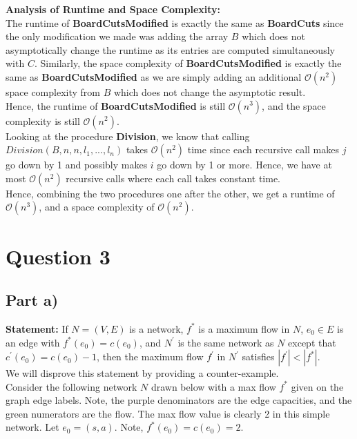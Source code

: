 \documentclass[12pt]{article}
\begin{document}
\textbf{Analysis of Runtime and Space Complexity:} \\

The runtime of \textbf{BoardCutsModified} is exactly the same as \textbf{BoardCuts} since the only modification we made was adding the array $B$ which does not asymptotically change the runtime as its entries are computed simultaneously with $C$. Similarly, the space complexity of \textbf{BoardCutsModified} is exactly the same as \textbf{BoardCutsModified} as we are simply adding an additional $\mathcal{O}(n^2)$ space complexity from $B$ which does not change the asymptotic result. \\

Hence, the runtime of \textbf{BoardCutsModified} is still $\mathcal{O}(n^3)$, and the space complexity is still $\mathcal{O}(n^2)$. \\

Looking at the procedure \textbf{Division}, we know that calling $Division(B,n,n,l_1,...,l_n)$ takes $\mathcal{O}(n^2)$ time since each recursive call makes $j$ go down by 1 and possibly makes $i$ go down by 1 or more. Hence, we have at most $\mathcal{O}(n^2)$ recursive calls where each call takes constant time. \\

Hence, combining the two procedures one after the other, we get a runtime of $\mathcal{O}(n^3)$, and a space complexity of $\mathcal{O}(n^2)$. \\

\newpage

\section*{Question 3}

\subsection*{Part a)}

\textbf{Statement:} If $N = (V,E)$ is a network, $f^*$ is a maximum flow in $N$, $e_0 \in E$ is an edge with $f^*(e_0) = c(e_0)$, and $N^\prime$ is the same network as $N$ except that $c^\prime(e_0) = c(e_0) - 1$, then the maximum flow $f^\prime$ in $N^\prime$ satisfies $|f^\prime| < |f^*|$. \\

We will disprove this statement by providing a counter-example. \\

Consider the following network $N$ drawn below with a max flow $f^*$ given on the graph edge labels. Note, the purple denominators are the edge capacities, and the green numerators are the flow. The max flow value is clearly 2 in this simple network. Let $e_0 = (s,a)$. Note, $f^*(e_0) = c(e_0) = 2$. 
\end{document}
